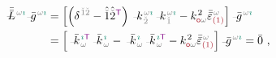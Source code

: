 \begin{subequations} \label{eq:simplify7-L-zeta}
	\begin{align}
		\!\!\!\! \Xint{\mathcolor{gray}{-}}{32}{\bar{\bar{L}}}^{\;\! \mathcolor{gray}{\omega} \textcolor{PineGreen}{\imath}} \Xint{{}^{}_{\mathcolor{gray}{-}}}{10}{\bar{g}}^{\;\!\mathcolor{gray}{\omega} \textcolor{PineGreen}{\imath}} &= \left[ \left( \delta^{\;\! \mathcolor{gray}{\check{1}} \mathcolor{gray}{\check{2}}} - \hat{\mathcolor{gray}{\check{1}}} \hat{\mathcolor{gray}{\check{2}}}^{\mathsf{\textcolor{Plum}{T}}} \right) \Xint{\begin{smallmatrix} ~ \\ {}^{}_{\mathcolor{gray}{-}} \\ ~ \end{smallmatrix}}{15}{k}_{\;\! \mathcolor{gray}{\check{2}}}^{\;\! \mathcolor{gray}{\omega} \textcolor{PineGreen}{\imath}} \Xint{\begin{smallmatrix} ~ \\ {}^{}_{\mathcolor{gray}{-}} \\ ~ \end{smallmatrix}}{15}{k}_{\;\! \mathcolor{gray}{\check{1}}}^{\;\! \mathcolor{gray}{\omega} \textcolor{PineGreen}{\imath}} - k_{\textcolor{Maroon}{\mathsf{o}} \mathcolor{gray}{\omega}}^{\;\! 2} \bar{\bar{\varepsilon}}^{\;\! \mathcolor{gray}{\omega}}_{\textcolor{Maroon}{(1)}} \right] \Xint{{}^{}_{\mathcolor{gray}{-}}}{10}{\bar{g}}^{\;\!\mathcolor{gray}{\omega} \textcolor{PineGreen}{\imath}} \label{eq:simplify7-L1-zeta} \\ 
		&= \left[ \Xint{\begin{smallmatrix} ~ \\ {}^{}_{\mathcolor{gray}{-}} \\ ~ \end{smallmatrix}}{15}{\bar{k}}_{\;\! \mathcolor{gray}{\omega}}^{\;\! \textcolor{PineGreen}{\imath} {\mathsf{\textcolor{Plum}{T}}}} \Xint{\begin{smallmatrix} ~ \\ {}^{}_{\mathcolor{gray}{-}} \\ ~ \end{smallmatrix}}{15}{\bar{k}}_{\;\! \mathcolor{gray}{\omega}}^{\;\! \textcolor{PineGreen}{\imath}} - \Xint{\begin{smallmatrix} ~ \\ {}^{}_{\mathcolor{gray}{-}} \\ ~ \end{smallmatrix}}{15}{\bar{k}}_{\;\! \mathcolor{gray}{\omega}}^{\;\! \textcolor{PineGreen}{\imath}} \Xint{\begin{smallmatrix} ~ \\ {}^{}_{\mathcolor{gray}{-}} \\ ~ \end{smallmatrix}}{15}{\bar{k}}_{\;\! \mathcolor{gray}{\omega}}^{\;\! \textcolor{PineGreen}{\imath} {\mathsf{\textcolor{Plum}{T}}}} - k_{\textcolor{Maroon}{\mathsf{o}} \mathcolor{gray}{\omega}}^{\;\! 2} \bar{\bar{\varepsilon}}^{\;\! \mathcolor{gray}{\omega}}_{\textcolor{Maroon}{(1)}} \right] \Xint{{}^{}_{\mathcolor{gray}{-}}}{10}{\bar{g}}^{\;\!\mathcolor{gray}{\omega} \textcolor{PineGreen}{\imath}} = \bar{0} ~, \label{eq:simplify7-L2-zeta}

\end{align}
\end{subequations}
